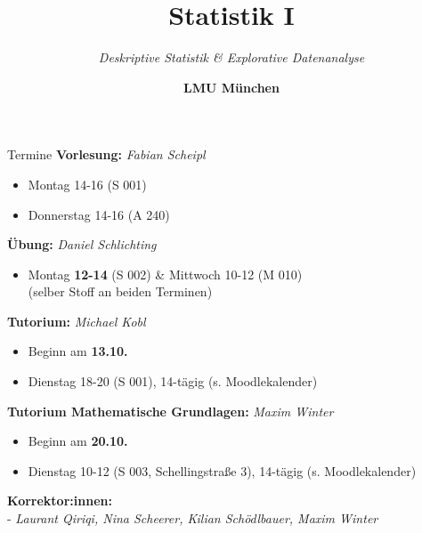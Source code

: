 \documentclass[
  10pt,
  ignorenonframetext,
]{beamer}
\title{Statistik I}
\subtitle{\emph{Deskriptive Statistik \& Explorative Datenanalyse}}
\author{\textbf{LMU München}}
\date{}
\providecommand{\tightlist}{%
  \setlength{\itemsep}{0pt}\setlength{\parskip}{0pt}}
\begin{document}
\frame{\titlepage}

\begin{frame}
\end{frame}

\begin{frame}{Termine}
\protect\hypertarget{termine}{}
\textbf{Vorlesung:} \emph{Fabian Scheipl}

\begin{itemize}
\tightlist
\item
  Montag 14-16 (S 001)\\
\item
  Donnerstag 14-16 (A 240) ~
\end{itemize}

\textbf{Übung:} \emph{Daniel Schlichting}

\begin{itemize}
\tightlist
\item
  Montag \textbf{12-14} (S 002) \& Mittwoch 10-12 (M 010)\\
  (selber Stoff an beiden Terminen) ~
\end{itemize}

\textbf{Tutorium:} \emph{Michael Kobl}

\begin{itemize}
\tightlist
\item
  Beginn am \textbf{13.10.}\\
\item
  Dienstag 18-20 (S 001), 14-tägig (s. Moodlekalender) ~
\end{itemize}

\textbf{Tutorium Mathematische Grundlagen:} \emph{Maxim Winter}

\begin{itemize}
\tightlist
\item
  Beginn am \textbf{20.10.}\\
\item
  Dienstag 10-12 (S 003, Schellingstraße 3), 14-tägig (s.
  Moodlekalender)
\end{itemize}

\textbf{Korrektor:innen:}\\
- \emph{Laurant Qiriqi, Nina Scheerer, Kilian Schödlbauer, Maxim Winter}
\end{frame}
\end{document}
